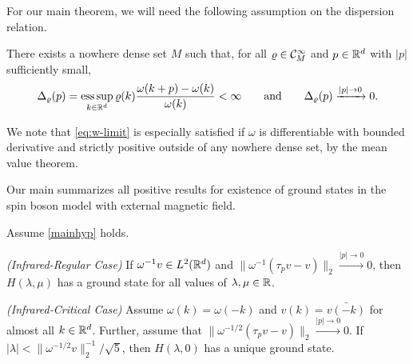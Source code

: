 \documentclass[a4paper,12pt,oneside]{article}
\begin{document}
For our main theorem, we will need the following assumption on the dispersion relation.
\begin{hyp}\label{mainhyp}\label{mainhyp:omega}
	There exists a nowhere dense set $M$ such that, for all $\varrho\in {\mathcal C}^\infty_M$ and $p\in{\mathbb R}^d$ with $|p|$ sufficiently small,
	\begin{equation}\label{eq:w-limit}
		\Delta_\varrho(p) = \operatorname*{ess\,sup}_{k\in{\mathbb R}^d} \varrho(k)\frac{\omega(k+p)-\omega(k)}{\omega(k)} < \infty  \qquad \mbox{and}\qquad \Delta_\varrho(p) \xrightarrow{|p|\to0} 0.
	\end{equation}
\end{hyp}
\begin{rem}
	We note that \cref{eq:w-limit} is especially satisfied if $\omega$ is differentiable with bounded derivative and strictly positive outside of any nowhere dense set, by the mean value theorem.
\end{rem}
Our main  summarizes all positive results for existence of ground states in the spin boson model with external magnetic field.
\begin{thm}\label{mainthm}
	Assume \cref{mainhyp} holds.
	\begin{enumthm}
		\item\label{mainthm:infregular} {\em (Infrared-Regular Case)} If $\omega^{-1}v\in L^2 ({\mathbb R}^d)$ and $\|\omega^{-1}(\tau_pv-v)\|_2\xrightarrow{|p|\to 0}0$, then $H(\lambda,\mu)$ has a ground state for all values of $\lambda,\mu\in{\mathbb R}$.
		\item\label{mainthm:existence} {\em (Infrared-Critical Case)} Assume $\omega(k)=\omega(-k)$ and $v(k)=\bar{v(-k)}$ for almost all $k\in{\mathbb R}^d$. Further, assume that $\|\omega^{-1/2}(\tau_pv-v)\|_2 \xrightarrow{|p|\to 0} 0$. If $|\lambda|<\|\omega^{-1/2}v\|_2^{-1}/\sqrt 5$, then $H(\lambda,0)$ has a unique ground state.
	\end{enumthm}
\end{thm}
\end{document}
